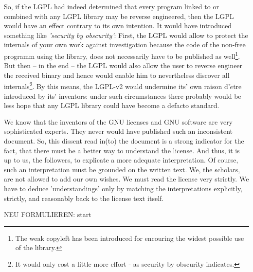 So, if the LGPL had indeed determined that every program linked to or combined
with any LGPL library may be reverse engineered, then the LGPL would have an
effect contrary to its own intention. It would have introduced something like
\emph{'security by obscurity'}: First, the LGPL would allow to protect the
internals of your own work against investigation because the code of the
non-free programm using the library, does not necessarily have to be published
as well\footnote{The weak copyleft has been introduced for encouring the widest
possible use of the library.}. But then -- in the end -- the LGPL would also
allow the user to reverse engineer the received binary and hence would enable
him to nevertheless discover all internals\footnote{It would only cost a little
more effort - as security by obscurity indicates.}. By this means, the LGPL-v2
would undermine its' own raison d'$\grave{e}$tre introduced by its' inventors:
under such circumstances there probably would be less hope that any LGPL library
could have become a defacto standard.

We know that the inventors of the GNU licenses and GNU software are very
sophisticated experts. They never would have published such an inconsistent
document. So, this dissent read in(to) the document is a strong indicator for
the fact, that there must be a better way to understand the license. And thus,
it is up to us, the followers, to explicate a more adequate interpretation. Of
course, such an interpretation must be grounded on the written text. We, the
scholars, are not allowed to add our own wishes. We must read the license very
strictly. We have to deduce 'understandings' only by matching the
interpretations explicitly, strictly, and reasonably back to the license text
itself.


NEU FORMULIEREN: start

